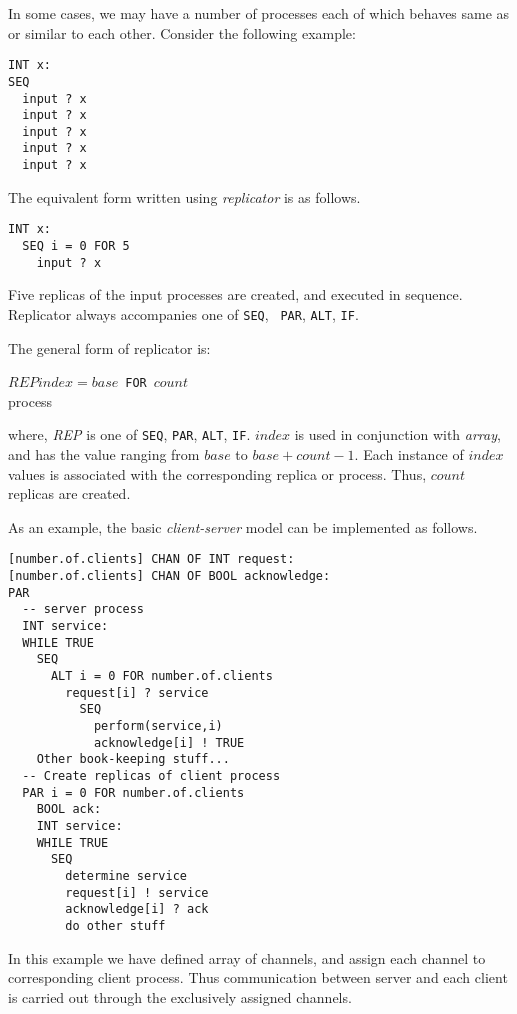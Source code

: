 
In some cases, we may have a number of processes each of which behaves
same as or similar to each other.  Consider the following example:
\begin{lin}
\begin{verbatim}
INT x:
SEQ
  input ? x
  input ? x
  input ? x
  input ? x
  input ? x
\end{verbatim}
\end{lin}
The equivalent form written using {\em replicator} is as follows.
\begin{lin}
\begin{verbatim}
INT x:
  SEQ i = 0 FOR 5
    input ? x
\end{verbatim}
\end{lin}
Five replicas of the input processes are created, and executed in
sequence.  Replicator always accompanies one of {\tt SEQ}, {\tt
PAR}, {\tt ALT}, {\tt IF}.  

The general form of replicator is:
\begin{lin}
$REP index = base$\ {\tt FOR}\ $count$ \\
\indent process \\
\end{lin}
where, {\em REP} is one of {\tt SEQ}, {\tt PAR}, {\tt ALT}, {\tt IF}.
$index$ is used in conjunction with {\em array}, and has the value
ranging from $base$ to $base + count -1$.  Each instance of $index$
values is associated with the corresponding replica or process.  Thus,
$count$ replicas are created.

As an example, the basic {\em client-server} model can be implemented as
follows.
\begin{lin}
\begin{verbatim}
[number.of.clients] CHAN OF INT request:
[number.of.clients] CHAN OF BOOL acknowledge:
PAR
  -- server process 
  INT service:
  WHILE TRUE
    SEQ
      ALT i = 0 FOR number.of.clients
        request[i] ? service
          SEQ
            perform(service,i)
            acknowledge[i] ! TRUE
    Other book-keeping stuff...
  -- Create replicas of client process
  PAR i = 0 FOR number.of.clients
    BOOL ack:
    INT service:
    WHILE TRUE
      SEQ
        determine service
        request[i] ! service  
        acknowledge[i] ? ack
        do other stuff
\end{verbatim}
\end{lin}
In this example we have defined array of channels, and assign each
channel to corresponding client process. Thus communication between
server and each client is carried out through the exclusively assigned
channels. 

